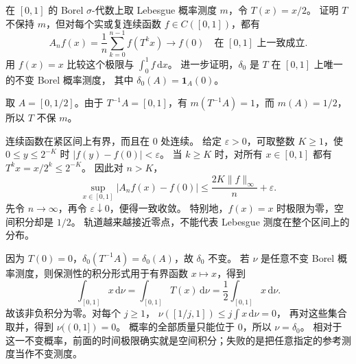 \BookExercises

\begin{exercise}\label{b1:ex:32-nonpreserving-contraction}
在 \([0,1]\) 的 Borel \(\sigma\)-代数上取 Lebesgue 概率测度 \(m\)，令 \(T(x)=x/2\)。
证明 \(T\) 不保持 \(m\)，但对每个实或复连续函数 \(f\in C([0,1])\)，都有
\[
 A_nf(x)=\frac1n\sum_{k=0}^{n-1}f(T^kx)\longrightarrow f(0)
 \quad\text{在 }[0,1]\text{ 上一致成立}.
\]
用 \(f(x)=x\) 比较这个极限与 \(\int_0^1f\,\mathrm dx\)。
进一步证明，\(\delta_0\) 是 \(T\) 在 \([0,1]\) 上唯一的不变 Borel 概率测度，
其中 \(\delta_0(A)=\mathbf1_A(0)\)。
\end{exercise}
\begin{solution}
取 \(A=[0,1/2]\)。由于 \(T^{-1}A=[0,1]\)，有
\(m(T^{-1}A)=1\)，而 \(m(A)=1/2\)，所以 \(T\) 不保 \(m\)。

连续函数在紧区间上有界，而且在 \(0\) 处连续。
给定 \(\varepsilon>0\)，可取整数 \(K\geq1\)，使
\(0\leq y\leq2^{-K}\) 时 \(|f(y)-f(0)|<\varepsilon\)。
当 \(k\geq K\) 时，对所有 \(x\in[0,1]\) 都有 \(T^kx=x/2^k\leq2^{-K}\)。
因此对 \(n>K\)，
\[
 \sup_{x\in[0,1]}|A_nf(x)-f(0)|
 \leq\frac{2K\|f\|_\infty}{n}+\varepsilon.
\]
先令 \(n\to\infty\)，再令 \(\varepsilon\downarrow0\)，便得一致收敛。
特别地，\(f(x)=x\) 时极限为零，空间积分却是 \(1/2\)。
轨道越来越接近零点，不能代表 Lebesgue 测度在整个区间上的分布。

因为 \(T(0)=0\)，\(\delta_0(T^{-1}A)=\delta_0(A)\)，故 \(\delta_0\) 不变。
若 \(\nu\) 是任意不变 Borel 概率测度，则保测性的积分形式用于有界函数 \(x\mapsto x\)，得到
\[
 \int_{[0,1]}x\,\mathrm d\nu
 =\int_{[0,1]}T(x)\,\mathrm d\nu
 =\frac12\int_{[0,1]}x\,\mathrm d\nu.
\]
故该非负积分为零。对每个 \(j\geq1\)，
\(\nu([1/j,1])\leq j\int x\,\mathrm d\nu=0\)，
再对这些集合取并，得到 \(\nu((0,1])=0\)。
概率的全部质量只能位于 \(0\)，所以 \(\nu=\delta_0\)。
相对于这一不变概率，前面的时间极限确实就是空间积分；失败的是把任意指定的参考测度当作不变测度。
\end{solution}

